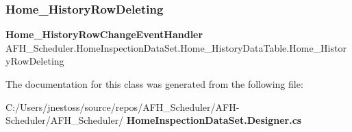 \mbox{\label{class_a_f_h___scheduler_1_1_home_inspection_data_set_1_1_home___history_data_table_a7db0a59a2cce3094375f09e7d573778b}} 
\subsubsection{Home\_HistoryRowDeleting}
{\footnotesize\ttfamily \textbf{ Home\+\_\+\+History\+Row\+Change\+Event\+Handler} A\+F\+H\+\_\+\+Scheduler.\+Home\+Inspection\+Data\+Set.\+Home\+\_\+\+History\+Data\+Table.\+Home\+\_\+\+History\+Row\+Deleting}



The documentation for this class was generated from the following file\+:\begin{DoxyCompactItemize}
\item 
C\+:/\+Users/jnestoss/source/repos/\+A\+F\+H\+\_\+\+Scheduler/\+A\+F\+H-\/\+Scheduler/\+A\+F\+H\+\_\+\+Scheduler/\textbf{ Home\+Inspection\+Data\+Set.\+Designer.\+cs}\end{DoxyCompactItemize}
